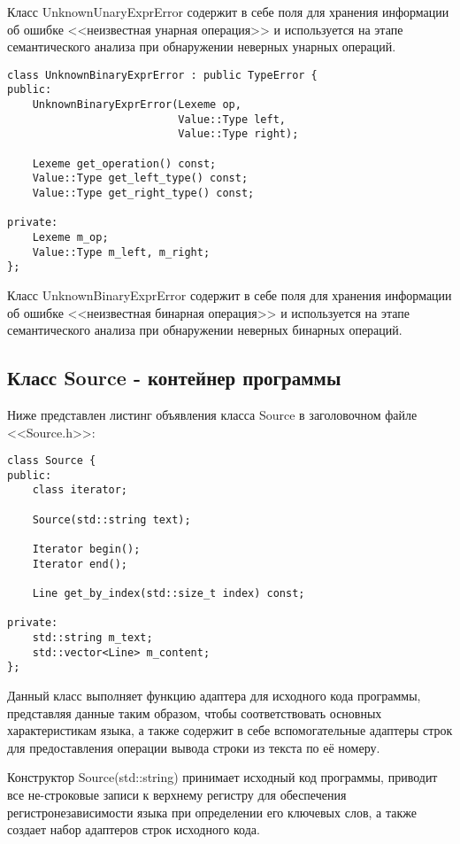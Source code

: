 Класс UnknownUnaryExprError содержит в себе поля
для хранения информации об ошибке <<неизвестная унарная операция>>
и используется на этапе семантического анализа при обнаружении
неверных унарных операций.

\begin{verbatim}
class UnknownBinaryExprError : public TypeError {
public:
    UnknownBinaryExprError(Lexeme op, 
                           Value::Type left, 
                           Value::Type right);

    Lexeme get_operation() const;
    Value::Type get_left_type() const;
    Value::Type get_right_type() const;

private:
    Lexeme m_op;
    Value::Type m_left, m_right;
};            
\end{verbatim}

Класс UnknownBinaryExprError содержит в себе поля
для хранения информации об ошибке <<неизвестная бинарная операция>>
и используется на этапе семантического анализа при обнаружении
неверных бинарных операций.

\subsection{Класс Source - контейнер программы}

Ниже представлен листинг объявления класса Source
в заголовочном файле <<Source.h>>:

\begin{verbatim}
class Source {
public:
    class iterator;

    Source(std::string text);

    Iterator begin();
    Iterator end();

    Line get_by_index(std::size_t index) const;

private:
    std::string m_text;
    std::vector<Line> m_content;
};
\end{verbatim}

Данный класс выполняет функцию адаптера для исходного кода
программы, представляя данные таким образом,
чтобы соответствовать основных характеристикам языка,
а также содержит в себе вспомогательные адаптеры
строк для предоставления операции вывода
строки из текста по её номеру.

Конструктор Source(std::string) принимает исходный код программы,
приводит все не-строковые записи к верхнему регистру для обеспечения
регистронезависимости языка при определении его ключевых слов,
а также создает набор адаптеров строк исходного кода.

